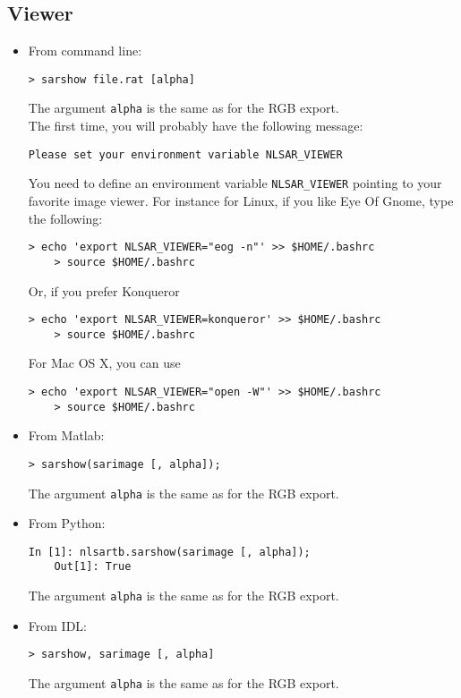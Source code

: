 \documentclass[10pt,french,english,a4paper]{article}
\begin{document}
\subsection{Viewer}

\begin{itemize}
\item From command line:
  \begin{Verbatim}[frame=single]
    > sarshow file.rat [alpha]
  \end{Verbatim}
  The argument \texttt{alpha} is the same as for the RGB export.\\
  The first time, you will probably have the following message:
  \begin{Verbatim}[frame=single]
    Please set your environment variable NLSAR_VIEWER
  \end{Verbatim}
  You need to define an environment variable \texttt{NLSAR\_VIEWER} pointing
  to your favorite image viewer. For instance for Linux, if you like
  Eye Of Gnome, type the following:
  \begin{Verbatim}[frame=single]
    > echo 'export NLSAR_VIEWER="eog -n"' >> $HOME/.bashrc
    > source $HOME/.bashrc
  \end{Verbatim}
  Or, if you prefer Konqueror
  \begin{Verbatim}[frame=single]
    > echo 'export NLSAR_VIEWER=konqueror' >> $HOME/.bashrc
    > source $HOME/.bashrc
  \end{Verbatim}
  For Mac OS X, you can use
  \begin{Verbatim}[frame=single]
    > echo 'export NLSAR_VIEWER="open -W"' >> $HOME/.bashrc
    > source $HOME/.bashrc
  \end{Verbatim}
\item From Matlab:
  \begin{Verbatim}[frame=single]
    > sarshow(sarimage [, alpha]);
  \end{Verbatim}
  The argument \texttt{alpha} is the same as for the RGB export.
\item From Python:
  \begin{Verbatim}[frame=single]
    In [1]: nlsartb.sarshow(sarimage [, alpha]);
    Out[1]: True
  \end{Verbatim}
  The argument \texttt{alpha} is the same as for the RGB export.
\item From IDL:
  \begin{Verbatim}[frame=single]
    > sarshow, sarimage [, alpha]
  \end{Verbatim}
  The argument \texttt{alpha} is the same as for the RGB export.
\end{itemize}
\end{document}

